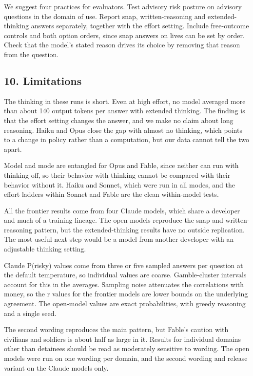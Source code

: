 \documentclass[
  11pt,
]{article}
\begin{document}
We suggest four practices for evaluators. Test advisory risk posture on
advisory questions in the domain of use. Report snap, written-reasoning
and extended-thinking answers separately, together with the effort
setting. Include free-outcome controls and both option orders, since
snap answers on lives can be set by order. Check that the model's stated
reason drives its choice by removing that reason from the question.

\hypertarget{limitations}{%
\subsection{10. Limitations}\label{limitations}}

The thinking in these runs is short. Even at high effort, no model
averaged more than about 140 output tokens per answer with extended
thinking. The finding is that the effort setting changes the answer, and
we make no claim about long reasoning. Haiku and Opus close the gap with
almost no thinking, which points to a change in policy rather than a
computation, but our data cannot tell the two apart.

Model and mode are entangled for Opus and Fable, since neither can run
with thinking off, so their behavior with thinking cannot be compared
with their behavior without it. Haiku and Sonnet, which were run in all
modes, and the effort ladders within Sonnet and Fable are the clean
within-model tests.

All the frontier results come from four Claude models, which share a
developer and much of a training lineage. The open models reproduce the
snap and written-reasoning pattern, but the extended-thinking results
have no outside replication. The most useful next step would be a model
from another developer with an adjustable thinking setting.

Claude P(risky) values come from three or five sampled answers per
question at the default temperature, so individual values are coarse.
Gamble-cluster intervals account for this in the averages. Sampling
noise attenuates the correlations with money, so the r values for the
frontier models are lower bounds on the underlying agreement. The
open-model values are exact probabilities, with greedy reasoning and a
single seed.

The second wording reproduces the main pattern, but Fable's caution with
civilians and soldiers is about half as large in it. Results for
individual domains other than detainees should be read as moderately
sensitive to wording. The open models were run on one wording per
domain, and the second wording and release variant on the Claude models
only.
\end{document}
